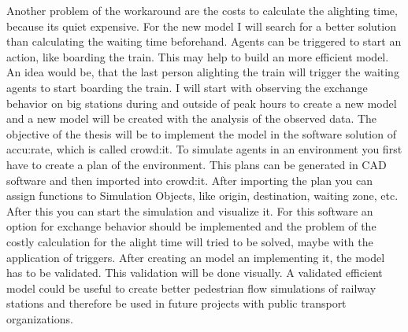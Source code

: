 \documentclass[a4paper, 12pt]{scrartcl}
\begin{document}
\newline
Another problem of the workaround are the costs to calculate the alighting time, because its quiet expensive. For the new model I will search for a better solution than calculating the waiting time beforehand. Agents can be triggered to start an action, like boarding the train. This may help to build an more efficient model. An idea would be, that the last person alighting the train will trigger the waiting agents to start boarding the train.
\newline
I will start with observing the exchange behavior on big stations during and outside of peak hours to create a new model and a new model will be created with the analysis of the observed data. The objective of the thesis will be to implement the model in the software solution of accu:rate, which is called crowd:it. To simulate agents in an environment you first have to create a plan of the environment. This plans can be generated in CAD software and then imported into crowd:it. After importing the plan you can assign functions to Simulation Objects, like origin, destination, waiting zone, etc. After this you can start the simulation and visualize it. For this software an option for exchange behavior should be implemented and the problem of the costly calculation for the alight time will tried to be solved, maybe with the application of triggers.
\newline
After creating an model an implementing it, the model has to be validated. This validation will be done visually. A validated efficient model could be useful to create better pedestrian flow simulations of railway stations and therefore be used in future projects with public transport organizations.
\end{document}
